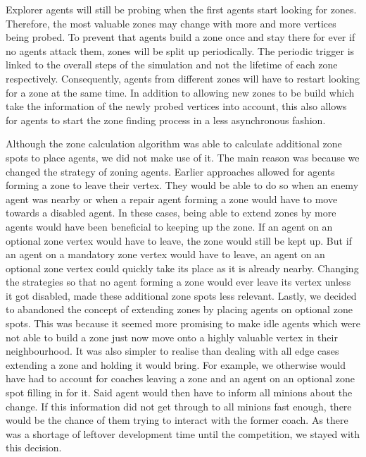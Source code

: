 Explorer agents will still be probing when the first agents start looking for zones.
Therefore, the most valuable zones may change with more and more vertices being probed.
To prevent that agents build a zone once and stay there for ever if no agents attack them, zones will be split up periodically.
The periodic trigger is linked to the overall steps of the simulation and not the lifetime of each zone respectively.
Consequently, agents from different zones will have to restart looking for a zone at the same time.
In addition to allowing new zones to be build which take the information of the newly probed vertices into account, this also allows for agents to start the zone finding process in a less asynchronous fashion.

Although the zone calculation algorithm was able to calculate additional zone spots to place agents, we did not make use of it.
The main reason was because we changed the strategy of zoning agents.
Earlier approaches allowed for agents forming a zone to leave their vertex.
They would be able to do so when an enemy agent was nearby or when a repair agent forming a zone would have to move towards a disabled agent.
In these cases, being able to extend zones by more agents would have been beneficial to keeping up the zone.
If an agent on an optional zone vertex would have to leave, the zone would still be kept up.
But if an agent on a mandatory zone vertex would have to leave, an agent on an optional zone vertex could quickly take its place as it is already nearby.
Changing the strategies so that no agent forming a zone would ever leave its vertex unless it got disabled, made these additional zone spots less relevant.
Lastly, we decided to abandoned the concept of extending zones by placing agents on optional zone spots.
This was because it seemed more promising to make idle agents which were not able to build a zone just now move onto a highly valuable vertex in their neighbourhood.
It was also simpler to realise than dealing with all edge cases extending a zone and holding it would bring.
For example, we otherwise would have had to account for coaches leaving a zone and an agent on an optional zone spot filling in for it.
Said agent would then have to inform all minions about the change.
If this information did not get through to all minions fast enough, there would be the chance of them trying to interact with the former coach.
As there was a shortage of leftover development time until the competition, we stayed with this decision.
